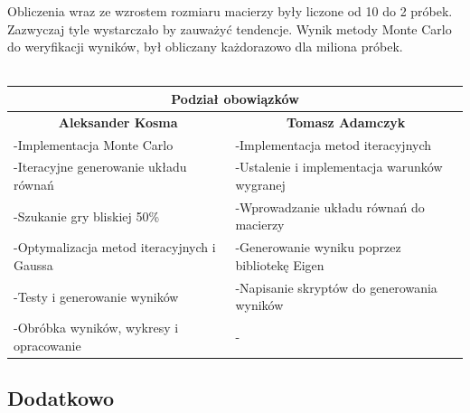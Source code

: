\documentclass[8pt]{article}
\begin{document}
Obliczenia wraz ze wzrostem rozmiaru macierzy były liczone od 10 do 2 próbek. Zazwyczaj tyle wystarczało by zauważyć tendencje. Wynik metody Monte Carlo do weryfikacji wyników, był obliczany każdorazowo dla miliona próbek.\\
\\
\begin{tabular}{ | p{8.2cm} | p{8.2cm} | }
  \hline
  \multicolumn{2}{|c|}{Podział obowiązków} \\
  \hline
  \multicolumn{1}{|c|}{\textbf{Aleksander Kosma} }& \multicolumn{1}{|c|}{\textbf{Tomasz Adamczyk}} \\
  \hline
  -Implementacja Monte Carlo & -Implementacja metod iteracyjnych \\\hline
   -Iteracyjne generowanie układu równań & -Ustalenie i implementacja warunków wygranej \\\hline
    -Szukanie gry bliskiej 50\% & -Wprowadzanie układu równań do macierzy \\\hline
  -Optymalizacja metod iteracyjnych i Gaussa & -Generowanie wyniku poprzez bibliotekę Eigen\\\hline
  -Testy i generowanie wyników & -Napisanie skryptów do generowania wyników \\\hline
  -Obróbka wyników, wykresy i opracowanie & - \\\hline
  
  \hline
\end{tabular}

\subsection*{Dodatkowo}
\end{document}
